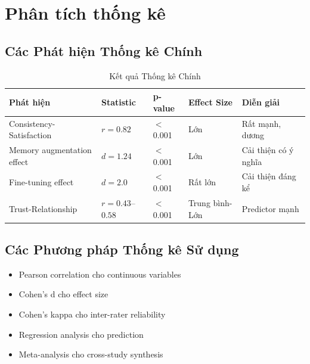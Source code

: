 \section{Phân tích thống kê}

\subsection{Các Phát hiện Thống kê Chính}

\begin{table}[H]
\centering
\caption{Kết quả Thống kê Chính}
\label{tab:stats}
\begin{tabular}{lllll}
\toprule
\textbf{Phát hiện} & \textbf{Statistic} & \textbf{p-value} & \textbf{Effect Size} & \textbf{Diễn giải} \\
\midrule
Consistency-Satisfaction & $r=0.82$ & $<$0.001 & Lớn & Rất mạnh, dương \\
Memory augmentation effect & $d=1.24$ & $<$0.001 & Lớn & Cải thiện có ý nghĩa \\
Fine-tuning effect & $d=2.0$ & $<$0.001 & Rất lớn & Cải thiện đáng kể \\
Trust-Relationship & $r=0.43$--$0.58$ & $<$0.001 & Trung bình-Lớn & Predictor mạnh \\
\bottomrule
\end{tabular}
\end{table}

\subsection{Các Phương pháp Thống kê Sử dụng}

\begin{itemize}
    \item Pearson correlation cho continuous variables
    \item Cohen's d cho effect size
    \item Cohen's kappa cho inter-rater reliability
    \item Regression analysis cho prediction
    \item Meta-analysis cho cross-study synthesis
\end{itemize}

